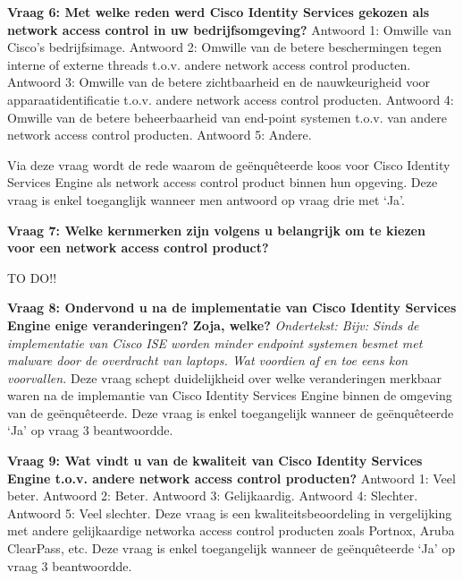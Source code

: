 \begin{itemize}
\newpage
\textbf{Vraag 6: Met welke reden werd Cisco Identity Services gekozen als network access control in uw bedrijfsomgeving?}
\newline
Antwoord 1: Omwille van Cisco’s bedrijfsimage. \newline
Antwoord 2: Omwille van de betere beschermingen tegen interne of externe threads t.o.v. andere network access control producten. \newline
Antwoord 3: Omwille van de betere zichtbaarheid en de nauwkeurigheid voor apparaatidentificatie t.o.v. andere network access control producten. \newline
Antwoord 4: Omwille van de betere beheerbaarheid van end-point systemen t.o.v. van andere network access control producten. \newline
Antwoord 5: Andere. \newline \newline

Via deze vraag wordt de rede waarom de geënquêteerde koos voor Cisco Identity Services Engine als network access control product binnen hun opgeving. Deze vraag is enkel toeganglijk wanneer men antwoord op vraag drie met ‘Ja’.

\textbf{Vraag 7: Welke kernmerken zijn volgens u belangrijk om te kiezen voor een network access control product?}
\newline

TO DO!!

\textbf{Vraag 8: Ondervond u na de implementatie van Cisco Identity Services Engine enige veranderingen? Zoja, welke?}
\newline
\textit{Ondertekst: Bijv: Sinds de implementatie van Cisco ISE worden minder endpoint systemen besmet met malware door de overdracht van laptops. Wat voordien af en toe eens kon voorvallen.}\newline
Deze vraag schept duidelijkheid over welke veranderingen merkbaar waren na de implemantie van Cisco Identity Services Engine binnen de omgeving van de geënquêteerde. Deze vraag is enkel toegangelijk wanneer de geënquêteerde ‘Ja’ op vraag 3 beantwoordde.

\textbf{Vraag 9: Wat vindt u van de kwaliteit van Cisco Identity Services Engine t.o.v. andere network access control producten?}
\newline
Antwoord 1: Veel beter. \newline
Antwoord 2: Beter. \newline
Antwoord 3: Gelijkaardig.\newline
Antwoord 4: Slechter.\newline
Antwoord 5: Veel slechter.\newline \newline
Deze vraag is een kwaliteitsbeoordeling in vergelijking met andere gelijkaardige networka access control producten zoals Portnox, Aruba ClearPass, etc. Deze vraag is enkel toegangelijk wanneer de geënquêteerde ‘Ja’ op vraag 3 beantwoordde.


\end{itemize}
